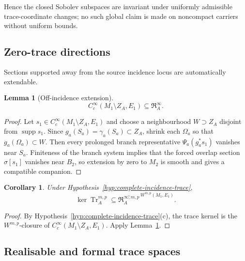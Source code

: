 \documentclass[11pt]{article}
\theoremstyle{plain}
\newtheorem{corollary}[theorem]{Corollary}
\newtheorem{lemma}[theorem]{Lemma}
\theoremstyle{definition}
\begin{document}
Hence the closed Sobolev subspaces are invariant under uniformly admissible trace-coordinate changes; no such global claim is made on noncompact carriers without uniform bounds.

\subsection{Zero-trace directions}
\label{subsec:zero-trace-directions}

Sections supported away from the source incidence locus are
automatically extendable.

\begin{lemma}[Off-incidence extension]
\label{lem:off-incidence-extension}
\[
  C_c^\infty(M_1\setminus Z_A,E_1)
  \subseteq
  \mathfrak R_A^\infty.
\]
\end{lemma}

\begin{proof}
Let \(s_1\in C_c^\infty(M_1\setminus Z_A,E_1)\) and choose a neighbourhood \(W\supset Z_A\) disjoint from \(\operatorname{supp}s_1\). Since \(g_a(S_a)=\gamma_a(S_a)\subset Z_A\), shrink each \(\Omega_a\) so that \(g_a(\Omega_a)\subset W\). Then every prolonged branch representative \(\Psi_a(g_a^*s_1)\) vanishes near \(S_a\). Finiteness of the branch system implies that the forced overlap section \(\sigma[s_1]\) vanishes near \(B_2\), so extension by zero to \(M_2\) is smooth and gives a compatible companion.
\end{proof}

\begin{corollary}
\label{cor:trace-kernel-in-closure}
Under
Hypothesis~\ref{hyp:complete-incidence-trace},
\[
  \ker\operatorname{Tr}_A^{m,p}
  \subseteq
  \overline{
    \mathfrak R_A^{\infty;m,p}
  }^{\,W^{m,p}(M_1,E_1)}.
\]
\end{corollary}

\begin{proof}
By
Hypothesis~\ref{hyp:complete-incidence-trace}\textup{(c)},
the trace kernel is the \(W^{m,p}\)-closure of
\(C_c^\infty(M_1\setminus Z_A,E_1)\).
Apply Lemma~\ref{lem:off-incidence-extension}.
\end{proof}



\subsection{Realisable and formal trace spaces}
\label{subsec:realizable-formal-traces}
\end{document}
